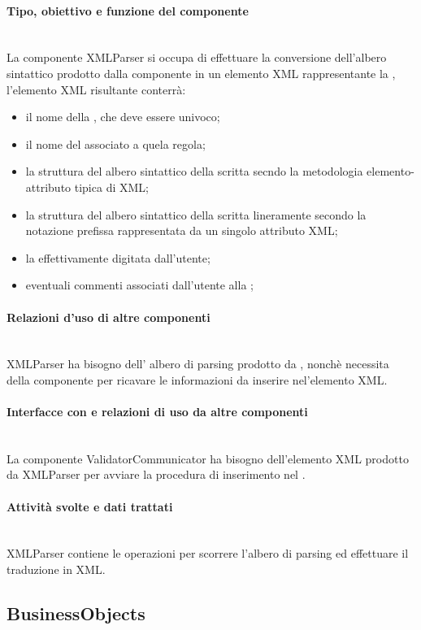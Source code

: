 \documentclass[11pt,titlepage,a4paper]{report}
\begin{document}
\paragraph{Tipo, obiettivo e funzione del componente}\\
La componente XMLParser si occupa di effettuare la conversione dell'albero sintattico prodotto dalla componente \brp in un elemento XML rappresentante la \br, l'elemento XML risultante conterr\`a:
\begin{itemize}
 \item il nome della \br, che deve essere univoco;
 \item il nome del \bo associato a quela regola;
 \item la struttura del albero sintattico della \br scritta secndo la metodologia elemento-attributo tipica di XML;
 \item la struttura del albero sintattico della \br scritta lineramente secondo la notazione prefissa rappresentata da un singolo attributo XML;
 \item la \br effettivamente digitata dall'utente;
 \item eventuali commenti associati dall'utente alla \br;
\end{itemize}
\paragraph{Relazioni d'uso di altre componenti}\\
XMLParser ha bisogno dell' albero di parsing prodotto da \brp, nonch\`e necessita della componente \br per ricavare le informazioni da inserire nel'elemento XML.
\paragraph{Interfacce con e relazioni di uso da altre componenti}\\
La componente ValidatorCommunicator ha bisogno dell'elemento XML prodotto da XMLParser per avviare la procedura di inserimento nel \re.
\paragraph{Attivit\`a svolte e dati trattati}\\
XMLParser contiene le operazioni per scorrere l'albero di parsing ed effettuare il traduzione in XML.

\subsection{BusinessObjects}%
\end{document}

